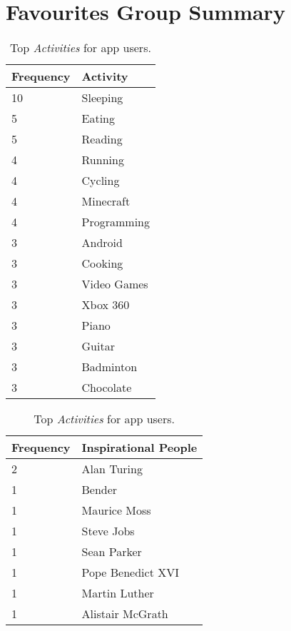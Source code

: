 
\appendix

\chapter{Favourites Group Summary}
\label{app:app1}
\begin{table}[h]
\begin{minipage}[b]{.50\textwidth}
\centering
  \begin{tabular}{|l|l|} %
  \hline
  		\textbf{Frequency} & \textbf{Activity} \\ \hline
  		10 & Sleeping \\ \hline
		5 & Eating \\ \hline
		5 & Reading \\ \hline
		4 & Running \\ \hline
		4 & Cycling \\ \hline
		4 & Minecraft \\ \hline
		4 & Programming \\ \hline
		3 & Android \\ \hline
		3 & Cooking \\ \hline
		3 & Video Games \\ \hline
		3 & Xbox 360 \\ \hline
		3 & Piano \\ \hline
		3 & Guitar \\ \hline
		3 & Badminton \\ \hline
		3 & Chocolate \\ \hline
  \end{tabular}
  \caption{Top \emph{Activities} for app users.}  
\end{minipage}
\begin{minipage}[b]{.50\textwidth}
\centering
  \begin{tabular}{|l|l|} %
  \hline
  		\textbf{Frequency} & \textbf{Inspirational People} \\ \hline
  		2 & Alan Turing \\ \hline
		1 & Bender \\ \hline
		1 & Maurice Moss \\ \hline
		1 & Steve Jobs \\ \hline
		1 & Sean Parker \\ \hline
		1 & Pope Benedict XVI \\ \hline
		1 & Martin Luther \\ \hline
		1 & Alistair McGrath \\ \hline

\end{tabular}
\end{minipage}
\end{table}
